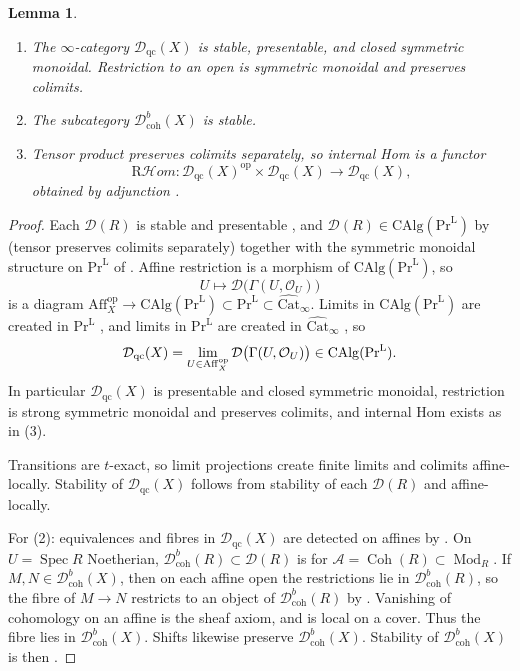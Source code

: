 \documentclass[11pt]{amsart}
\newcommand{\cA}{\mathcal{A}}
\newcommand{\cO}{\mathcal{O}}
\newcommand{\cD}{\mathcal{D}}
\newcommand{\Mod}{\operatorname{Mod}}
\newcommand{\op}{{\operatorname{op}}}
\renewcommand{\lim}{\operatornamewithlimits{\rm{lim}}}
\newcommand{\Coh}{\operatorname{{Coh}}}
\newcommand{\Spec}{\operatorname{Spec}}
\renewcommand{\Pr}{\mathrm{Pr}}
\newcommand{\Aff}{\mathrm{Aff}}
\newcommand{\CAlg}{\mathrm{CAlg}}
\newcommand{\Catbig}{\widehat{\mathrm{Cat}}}
\newcommand{\RHom}{\mathrm R\mathcal Hom}
\newcommand{\Dqc}{\mathcal D_{\mathrm{qc}}}
\newcommand{\Dbc}{\mathcal D^b_{\mathrm{coh}}}
\theoremstyle{plain}
\newtheorem{lemma}[lemma]{Lemma}
\theoremstyle{definition}
\numberwithin{equation}{section}
\begin{document}
\begin{lemma}\label{lem:dqc-properties}
\begin{enumerate}
\item
The $\infty$-category $\Dqc(X)$ is stable, presentable, and closed symmetric monoidal.
Restriction to an open is symmetric monoidal and preserves colimits.
\item
The subcategory $\Dbc(X)$ is stable.
\item
Tensor product preserves colimits separately, so internal Hom is a functor
\[
 \RHom:\Dqc(X)^{\op}\times\Dqc(X)\longrightarrow\Dqc(X),
\]
obtained by adjunction \cite[Corollary 5.5.2.9]{HTT}.
\end{enumerate}
\end{lemma}
\begin{proof}
Each $\cD(R)$ is stable and presentable \cite[Proposition 1.3.5.9, Proposition 1.3.5.21]{HA}, and $\cD(R)\in\CAlg(\Pr^{\mathrm L})$ by \cite[Theorem 7.1.2.13; Definition 4.1.1.15]{HA} (tensor preserves colimits separately) together with the symmetric monoidal structure on $\Pr^{\mathrm L}$ of \cite[Proposition 4.8.1.15]{HA}.
Affine restriction is a morphism of $\CAlg(\Pr^{\mathrm L})$, so
\[
 U\longmapsto\cD\bigl(\Gamma(U,\cO_U)\bigr)
\]
is a diagram $\Aff_X^{\op}\to\CAlg(\Pr^{\mathrm L})\subset\Pr^{\mathrm L}\subset\Catbig_\infty$.
Limits in $\CAlg(\Pr^{\mathrm L})$ are created in $\Pr^{\mathrm L}$ \cite[Corollary 3.2.2.5]{HA}, and limits in $\Pr^{\mathrm L}$ are created in $\Catbig_\infty$ \cite[Proposition 5.5.3.13]{HTT}, so
\[
 \Dqc(X)=\lim_{U\in\Aff_X^{\op}}\cD\bigl(\Gamma(U,\cO_U)\bigr)\in\CAlg(\Pr^{\mathrm L}).
\]
In particular $\Dqc(X)$ is presentable and closed symmetric monoidal, restriction is strong symmetric monoidal and preserves colimits, and internal Hom exists as in \textup{(3)}.

Transitions are $t$-exact, so limit projections create finite limits and colimits affine-locally.
Stability of $\Dqc(X)$ follows from stability of each $\cD(R)$ and \cite[Corollary 1.4.2.27]{HA} affine-locally.

For (2): equivalences and fibres in $\Dqc(X)$ are detected on affines by .
On $U=\Spec R$ Noetherian, $\mathcal D^b_{\mathrm{coh}}(R)\subset\cD(R)$ is  for $\cA=\Coh(R)\subset\Mod_R$.
If $M,N\in\Dbc(X)$, then on each affine open the restrictions lie in $\mathcal D^b_{\mathrm{coh}}(R)$, so the fibre of $M\to N$ restricts to an object of $\mathcal D^b_{\mathrm{coh}}(R)$ by .
Vanishing of cohomology on an affine is the sheaf axiom, and is local on a cover.
Thus the fibre lies in $\Dbc(X)$.
Shifts likewise preserve $\Dbc(X)$.
Stability of $\Dbc(X)$ is then \cite[Lemma 1.1.3.3]{HA}.
\end{proof}
\end{document}
